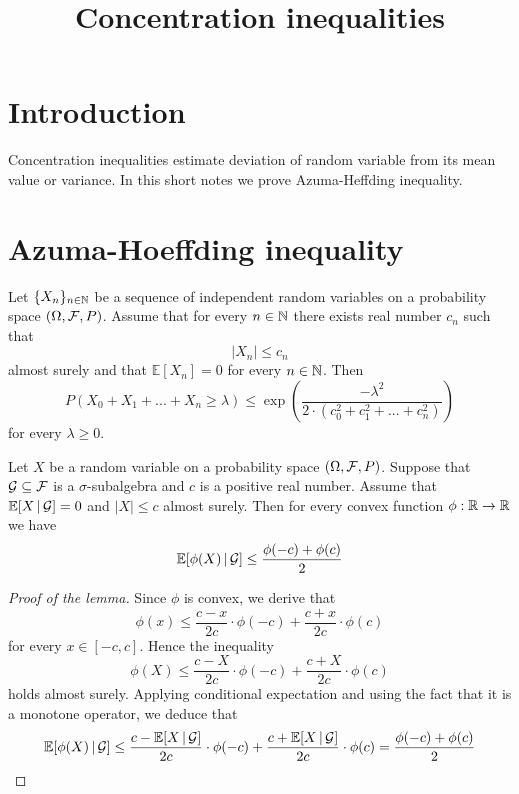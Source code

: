 



\title{Concentration inequalities}
\date{}
\maketitle

\section{Introduction}
\noindent
Concentration inequalities estimate deviation of random variable from its mean value or variance. In this short notes we prove Azuma-Heffding inequality. 

\section{Azuma-Hoeffding inequality}

\begin{theorem}\label{theorem:Azuma'ainequality}
Let $\{X_n\}_{n\in {\mathbb N}}$ be a sequence of independent random variables on a probability space $\left(\Omega, {\mathcal F},P\right)$. Assume that for every $n\in {\mathbb N}$ there exists real number $c_n$ such that 
$$|X_n|\leq c_n$$
almost surely and that $\mathbb{E}[X_n]=0$ for every $n\in {\mathbb N}$. Then 
$$P\left(X_0+X_1+...+X_n\geq \lambda\right)\leq \exp\left(\frac{-\lambda^2}{2\cdot \left(c_0^2+c_1^2+...+c^2_n\right)}\right)$$
for every $\lambda \geq 0$.
\end{theorem}

\begin{lemma}\label{lemma:betterJensen}
Let $X$ be a random variable on a probability space $\left(\Omega, {\mathcal F}, P\right)$. Suppose that ${\mathcal G}\subseteq {\mathcal F}$ is a $\sigma$-subalgebra and $c$ is a positive real number. Assume that ${\mathbb E}[X\,|\,{\mathcal G}]=0$ and $|X|\leq c$ almost surely. Then for every convex function $\phi:{\mathbb R}\rightarrow {\mathbb R}$ we have
$${\mathbb E} [\phi(X)\,|\,{\mathcal G}]\leq \frac{\phi(-c)+\phi(c)}{2}$$
\end{lemma}
\begin{proof}[Proof of the lemma]
Since $\phi$ is convex, we derive that
$$\phi(x) \leq \frac{c-x}{2c}\cdot \phi(-c)+\frac{c+x}{2c}\cdot \phi(c)$$
for every $x\in [-c,c]$. Hence the inequality
$$\phi(X)\leq \frac{c-X}{2c}\cdot \phi(-c)+\frac{c+X}{2c}\cdot \phi(c)$$
holds almost surely. Applying conditional expectation and using the fact that it is a monotone operator, we deduce that 
$${\mathbb E} [\phi(X)\,|\,{\mathcal G}] \leq \frac{c-{\mathbb E}[X\,|\,{\mathcal G}]}{2c}\cdot \phi(-c)+\frac{c+{\mathbb E}[X\,|\,{\mathcal G}]}{2c}\cdot \phi(c)=\frac{\phi(-c)+\phi(c)}{2}$$
\end{proof}

